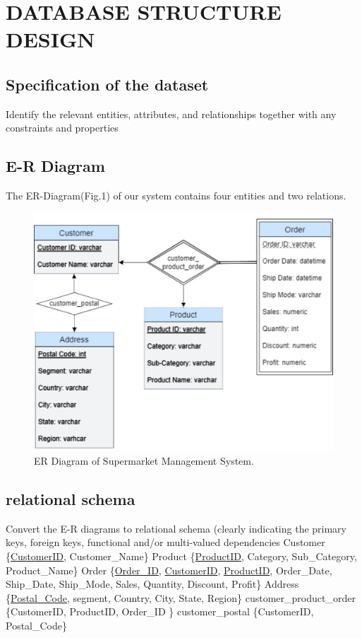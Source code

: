 \section{DATABASE STRUCTURE DESIGN}
\label{section:design}

\subsection{Specification of the dataset}
\label{sect:sub-title}
Identify the relevant entities, attributes, and relationships together with any 
constraints and properties

\subsection{E-R Diagram}
\label{sect:sub-title}
The ER-Diagram(Fig.1) of our system contains four entities
and two relations.
\begin{figure}[H]
    \centering
    \includegraphics[width=\columnwidth]{images/ER.jpg}
    \caption[Short text]{ER Diagram of Supermarket Management System.}
    \label{fig:ER}
\end{figure}


\subsection{relational schema}
\label{sect:sub-title}
Convert the E-R diagrams to relational schema (clearly indicating the primary
keys, foreign keys, functional and/or multi-valued dependencies\newline
Customer \{\underline{CustomerID}, Customer\_Name\} \newline
Product \{\underline{ProductID}, Category, Sub\_Category, Product\_Name\} \newline
Order \{\underline{Order\_ID}, \underline{CustomerID}, \underline{ProductID}, Order\_Date, Ship\_Date, Ship\_Mode, Sales, Quantity, Discount, Profit\}\newline
Address \{\underline{Postal\_Code}, segment,  Country, City, State,  Region\}\newline
customer\_product\_order \{CustomerID, ProductID, Order\_ID \}\newline
customer\_postal \{CustomerID, Postal\_Code\}

